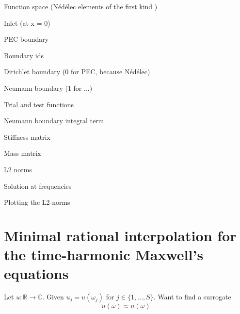 \documentclass[11pt, a4paper]{article}
\begin{document}
Function space (Nédélec elements of the first kind \cite{monk})


Inlet (at x = 0)


PEC boundary


Boundary ids


Dirichlet boundary (0 for PEC, because Nédélec)


Neumann boundary (1 for ...)


Trial and test functions


Neumann boundary integral term


Stiffness matrix


Mass matrix


L2 norms


Solution at frequencies


Plotting the L2-norms



\pagebreak
\section{Minimal rational interpolation for the time-harmonic Maxwell's equations}
\label{sec:mri}

Let $u : \mathbb{R} \to \mathbb{C}$.
Given $u_j = u(\omega_j)$ for $j \in \{1, \dots, S\}$. Want to find a surrogate
\begin{equation}
    \tilde{u}(\omega) \approx u(\omega)
\end{equation}
\end{document}
